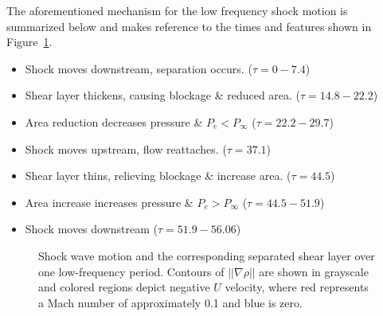 \documentclass[]{aiaa-tc}%
\begin{document}
The aforementioned mechanism for the low frequency shock motion is summarized below and makes reference to the times and features shown in Figure~\ref{fig:history}.
\begin{itemize}
	\item Shock moves downstream, separation occurs. ($\tau=0-7.4$)
	\item Shear layer thickens, causing blockage \& reduced area. ($\tau=14.8-22.2$)
	\item Area reduction decreases pressure \& $P_e < P_{\infty}$ ($\tau=22.2-29.7$)
	\item Shock moves upstream, flow reattaches. ($\tau=37.1$)
	\item Shear layer thins, relieving blockage \& increase area. ($\tau=44.5$)
	\item Area increase increases pressure \& $P_e > P_{\infty}$ ($\tau=44.5-51.9$)
	\item Shock moves downstream ($\tau=51.9-56.06$)
\end{itemize}

\begin{figure}[!ht]
  \centering
  
  
  \hspace{0.1in}	            
  \hspace{0.1in}	
  
  \vspace{-.1in}
  
  \hspace{0.1in}	            
  \hspace{0.1in}	
  
  \vspace{-.1in}
  
  \hspace{0.1in}	            
  \hspace{0.1in}	
  
  \caption{Shock wave motion and the corresponding separated shear layer over one low-frequency period.  Contours of $||\nabla\rho||$ are shown in grayscale and colored regions depict negative $U$ velocity, where red represents a Mach number of approximately 0.1 and blue is zero.    }
  
  \label{fig:history}
\end{figure}
\end{document}
